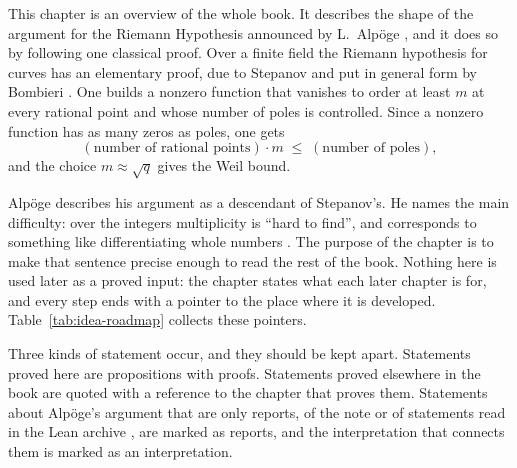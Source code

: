 \documentclass[11pt]{amsbook}
\theoremstyle{plain}
\theoremstyle{definition}
\theoremstyle{remark}
\numberwithin{equation}{section}
\numberwithin{figure}{chapter}
\numberwithin{table}{chapter}
\begin{document}
This chapter is an overview of the whole book. It describes the shape
of the argument for the Riemann Hypothesis announced by L.~Alp\"oge
\cite{AlpogeRemark2026}, and it does so by following one classical
proof. Over a finite field the Riemann hypothesis for curves has an
elementary proof, due to Stepanov \cite{Stepanov1969} and put in
general form by Bombieri \cite{Bombieri1974}. One builds a nonzero
function that vanishes to order at least $m$ at every rational point
and whose number of poles is controlled. Since a nonzero function has
as many zeros as poles, one gets
\[
  (\text{number of rational points}) \cdot m
  \;\le\; (\text{number of poles}),
\]
and the choice $m \approx \sqrt q$ gives the Weil bound.

Alp\"oge describes his argument as a descendant of Stepanov's. He
names the main difficulty: over the integers multiplicity is ``hard
to find'', and corresponds to something like differentiating whole
numbers \cite[p.~1]{AlpogeRemark2026}. The purpose of the chapter is
to make that sentence precise enough to read the rest of the book.
Nothing here is used later as a proved input: the chapter states what
each later chapter is for, and every step ends with a pointer to the
place where it is developed. Table~\ref{tab:idea-roadmap} collects
these pointers.

Three kinds of statement occur, and they should be kept apart.
Statements proved here are propositions with proofs. Statements
proved elsewhere in the book are quoted with a reference to the
chapter that proves them. Statements about Alp\"oge's argument that
are only reports, of the note \cite{AlpogeRemark2026} or of
statements read in the Lean archive \cite{AlpogeArchive2026}, are
marked as reports, and the interpretation that connects them is
marked as an interpretation.
\end{document}

